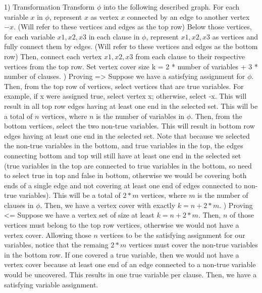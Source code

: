 \documentclass[11pt, oneside]{article}
\begin{document}
1)  Transformation \newline
    Transform $\phi$ into the following described graph. \newline
    For each variable $x$ in $\phi$, represent $x$ as vertex $x$ connected by an edge to another vertex $-x$. (Will refer to these vertices and edges as the top row) \newline
    Below those vertices, for each variable $x1, x2, x3$ in each clause in $\phi$, represent $x1, x2, x3$ as vertices and fully connect them by edges. (Will refer to these vertices and edges as the bottom row) \newline 
    Then, connect each vertex $x1, x2, x3$ from each clause to their respective vertices from the top row. \newline
    Set vertex cover size k = 2 * number of variables + 3 * number of clauses. )  Proving =\textgreater \newline
    Suppose we have a satisfying assignment for $\phi$. \newline
    Then, from the top row of vertices, select vertices that are true variables. For example, if x were assigned true, select vertex x; otherwise, select -x. This will result in all top row edges having at least one end in the selected set. This will be a total of $n$ vertices, where $n$ is the number of variables in $\phi$. \newline
    Then, from the bottom vertices, select the two non-true variables. This will result in bottom row edges having at least one end in the selected set. Note that because we selected the non-true variables in the bottom, and true variables in the top, the edges connecting bottom and top will still have at least one end in the selected set (true variables in the top are connected to true variables in the bottom, so need to select true in top and false in bottom, otherwise we would be covering both ends of a single edge and not covering at least one end of edges connected to non-true variables). This will be a total of $2 * m$ vertices, where $m$ is the number of clauses in $\phi$. \newline
    Then, we have a vertex cover with exactly $k = n + 2 * m$. )  Proving \textless= \newline
    Suppose we have a vertex set of size at least $k = n + 2 * m$. \newline
    Then, $n$ of those vertices must belong to the top row vertices, otherwise we would not have a vertex cover. \newline
    Allowing those $n$ vertices to be the satisfying assignment for our variables, notice that the remaing $2 * m$ vertices must cover the non-true variables in the bottom row. If one covered a true variable, then we would not have a vertex cover because at least one end of an edge connected to a non-true variable would be uncovered. This results in one true variable per clause. \newline
    Then, we have a satisfying variable assignment. \newline
\clearpage
\end{document}
